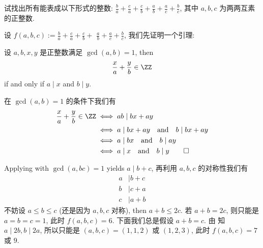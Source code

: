 \begin{prob}
\label{prob:prob-12}
试找出所有能表成以下形式的整数:
$\frac{b}{a}+\frac{c}{a}+\frac{c}{b}+\frac{a}{b}+\frac{a}{c}+\frac{b}{c}$,
其中 $a, b, c$ 为两两互素的正整数.
\end{prob}

\begin{soln}
设 $f(a,b,c) := \frac{b}{a} + \frac{c}{a} + \frac{c}{b} +$
$\frac{a}{b} + \frac{a}{c} + \frac{b}{c}$,
我们先证明一个引理:

\begin{lem}
\label{lem:prob-12}
设 $a, b, x, y$ 是正整数满足 $\gcd(a, b) = 1$, then
\[
\frac{x}{a} + \frac{y}{b} \in \ZZ
\]
if and only if $a \mid x$ and $b \mid y$.
\end{lem}

\begin{subproof}
在 $\gcd(a, b) = 1$ 的条件下我们有
\begin{align*}
\frac{x}{a} + \frac{y}{b} \in \ZZ &\iff ab \mid bx + ay \\
                                  &\iff a \mid bx + ay \quad \text{and} \quad b \mid bx + ay \\
                                  &\iff a \mid bx \quad \text{and} \quad b \mid ay \\
                                  &\iff a \mid x \quad \text{and} \quad b \mid y \qedhere
\end{align*}
\end{subproof}

Applying  with $\gcd(a, bc) = 1$ yields
$a \mid b + c$, 再利用 $a, b, c$ 的对称性我们有
\begin{equation}
\label{eq:prob-12-eq-1}
\begin{aligned}
a &\mid b + c \\
b &\mid c + a \\
c &\mid a + b
\end{aligned}
\end{equation}
不妨设 $a \le b \le c$ (还是因为 $a, b, c$ 对称),
then $a + b \le 2c$. 若 $a + b = 2c$, 则只能是 $a = b = c = 1$,
此时 $f(a,b,c) = \boxed{6}$. 下面我们总是假设 $a + b = c$.
由  知 $a \mid 2b, b \mid 2a$,
所以只能是 $(a, b, c) = (1, 1, 2)$ 或 $(1, 2, 3)$,
此时 $f(a,b,c) = \boxed{7}$ 或 $\boxed{9}$.
\end{soln}
